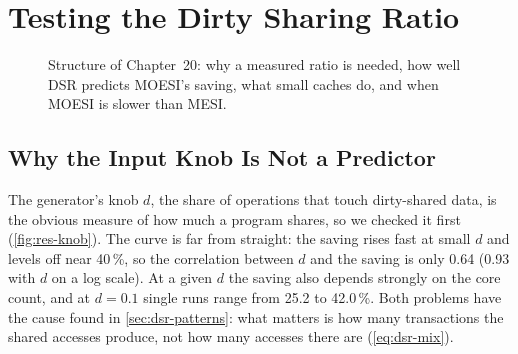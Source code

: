 \chapter{Testing the Dirty Sharing Ratio}
\label{ch:res-dsr}
%

\begin{figure}[htbp]
\centering
{}
\caption[]{Structure of Chapter~20: why a measured ratio is
needed, how well DSR predicts MOESI's saving, what small caches do, and when MOESI
is slower than MESI.}
\label{fig:ch20-map}
\end{figure}

\section{Why the Input Knob Is Not a Predictor}
\label{sec:res-knob}

The generator's knob $d$, the share of operations that touch dirty-shared data, is
the obvious measure of how much a program shares, so we checked it first
(\cref{fig:res-knob}). The curve is far from straight: the saving rises fast at
small $d$ and levels off near 40\,\%, so the correlation between $d$ and the saving
is only 0.64 (0.93 with $d$ on a log scale). At a given $d$ the saving also depends
strongly on the core count, and at $d=0.1$ single runs range from 25.2 to 42.0\,\%.
Both problems have the cause found in \cref{sec:dsr-patterns}: what matters is how
many transactions the shared accesses produce, not how many accesses there are
(\cref{eq:dsr-mix}).

